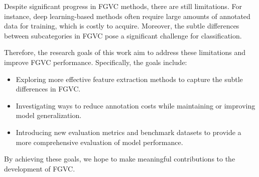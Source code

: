 Despite significant progress in FGVC methods, there are still limitations. For instance, deep learning-based methods often require large amounts of annotated data for training, which is costly to acquire. Moreover, the subtle differences between subcategories in FGVC pose a significant challenge for classification.

Therefore, the research goals of this work aim to address these limitations and improve FGVC performance. Specifically, the goals include:
\begin{itemize}
    \item Exploring more effective feature extraction methods to capture the subtle differences in FGVC.
    \item Investigating ways to reduce annotation costs while maintaining or improving model generalization.
    \item Introducing new evaluation metrics and benchmark datasets to provide a more comprehensive evaluation of model performance.
\end{itemize}
By achieving these goals, we hope to make meaningful contributions to the development of FGVC.
